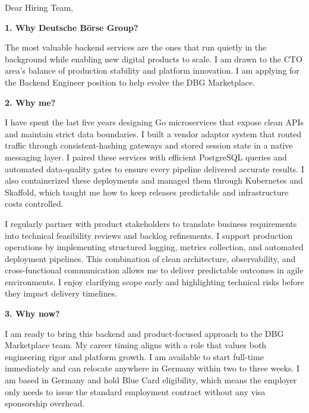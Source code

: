 \documentclass[11pt,a4paper]{coverletter}
\begin{document}

\opening{Dear Hiring Team,}

\vspace{8pt}\noindent\textbf{1. Why Deutsche Börse Group?}\par\vspace{3pt}

The most valuable backend services are the ones that run quietly in the background while enabling new digital products to scale. I am drawn to the CTO area’s balance of production stability and platform innovation. I am applying for the Backend Engineer position to help evolve the DBG Marketplace.

\vspace{8pt}\noindent\textbf{2. Why me?}\par\vspace{3pt}

I have spent the last five years designing Go microservices that expose clean APIs and maintain strict data boundaries. I built a vendor adaptor system that routed traffic through consistent-hashing gateways and stored session state in a native messaging layer. I paired these services with efficient PostgreSQL queries and automated data-quality gates to ensure every pipeline delivered accurate results. I also containerized these deployments and managed them through Kubernetes and Skaffold, which taught me how to keep releases predictable and infrastructure costs controlled.

I regularly partner with product stakeholders to translate business requirements into technical feasibility reviews and backlog refinements. I support production operations by implementing structured logging, metrics collection, and automated deployment pipelines. This combination of clean architecture, observability, and cross-functional communication allows me to deliver predictable outcomes in agile environments. I enjoy clarifying scope early and highlighting technical risks before they impact delivery timelines.

\vspace{8pt}\noindent\textbf{3. Why now?}\par\vspace{3pt}

I am ready to bring this backend and product-focused approach to the DBG Marketplace team. My career timing aligns with a role that values both engineering rigor and platform growth. I am available to start full-time immediately and can relocate anywhere in Germany within two to three weeks. I am based in Germany and hold Blue Card eligibility, which means the employer only needs to issue the standard employment contract without any visa sponsorship overhead.
\end{document}
